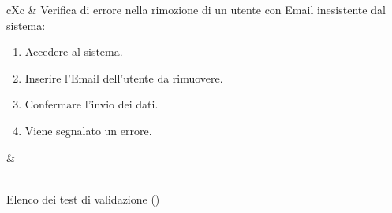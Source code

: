 \begin{table}[H]
\begin{VTtable}[1.7]{\textwidth}{cXc}
        \addtotv & Verifica di errore nella rimozione di un utente con Email inesistente dal sistema:
		\begin{enumerate}
			\item Accedere al sistema.
            \item Inserire l'Email dell'utente da rimuovere.
            \item Confermare l'invio dei dati.
            \item Viene segnalato un errore.
		\end{enumerate}
		& \TNI \\
        \bottomrule\\
	\end{VTtable}
	\caption{Elenco dei test di validazione (\thetableCounter)}
\end{table}

